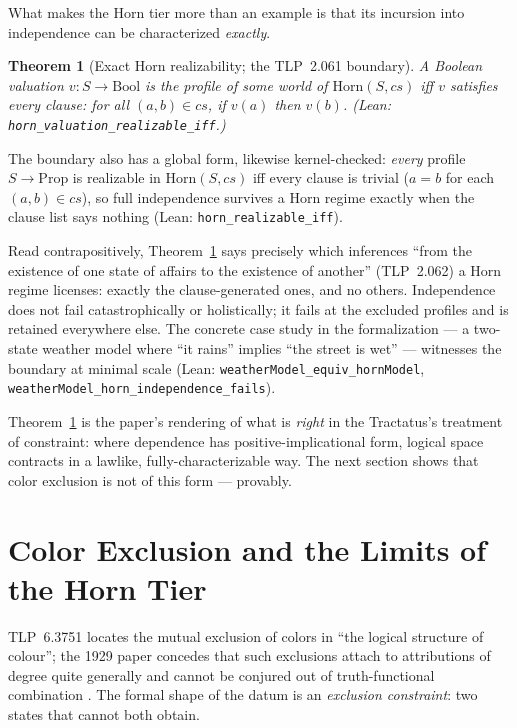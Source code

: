 \documentclass[10pt, letterpaper]{article}
\newtheorem{theorem}{Theorem}[section]
\theoremstyle{remark}
\newcommand{\lean}[1]{\texttt{#1}}
\newcommand{\TLP}[1]{TLP~#1}
\begin{document}
What makes the Horn tier more than an example is that its incursion into
independence can be characterized \emph{exactly}.

\begin{theorem}[Exact Horn realizability; the \TLP{2.061} boundary]
\label{thm:horn-boundary}
A Boolean valuation $v : S \to \mathrm{Bool}$ is the profile of some world of
$\mathrm{Horn}(S, \mathit{cs})$ iff $v$ satisfies every clause: for all
$(a, b) \in \mathit{cs}$, if $v(a)$ then $v(b)$. (Lean:
\lean{horn\_valuation\_realizable\_iff}.)
\end{theorem}

The boundary also has a global form, likewise kernel-checked: \emph{every}
profile $S \to \mathrm{Prop}$ is realizable in $\mathrm{Horn}(S, \mathit{cs})$
iff every clause is trivial ($a = b$ for each $(a, b) \in \mathit{cs}$), so
full independence survives a Horn regime exactly when the clause list says
nothing (Lean: \lean{horn\_realizable\_iff}).

Read contrapositively, Theorem~\ref{thm:horn-boundary} says precisely which inferences ``from the
existence of one state of affairs to the existence of another''
(\TLP{2.062}) a Horn regime licenses: exactly the clause-generated ones, and
no others. Independence does not fail catastrophically or holistically; it
fails at the excluded profiles and is retained everywhere else. The
concrete case study in the formalization --- a two-state weather model where
``it rains'' implies ``the street is wet'' --- witnesses the boundary at
minimal scale (Lean: \lean{weatherModel\_equiv\_hornModel},
\lean{weatherModel\_horn\_independence\_fails}).

Theorem~\ref{thm:horn-boundary} is the paper's rendering of what is
\emph{right} in the Tractatus's treatment of constraint: where dependence has
positive-implicational form, logical space contracts in a lawlike,
fully-characterizable way. The next section shows that color exclusion is
not of this form --- provably.

\section{Color Exclusion and the Limits of the Horn Tier}
\label{sec:exclusion}

\TLP{6.3751} locates the mutual exclusion of colors in ``the logical
structure of colour''; the 1929 paper concedes that such exclusions attach to
attributions of degree quite generally and cannot be conjured out of
truth-functional combination \cite{wittgenstein1929}. The formal shape of the
datum is an \emph{exclusion constraint}: two states that cannot both obtain.
\end{document}
